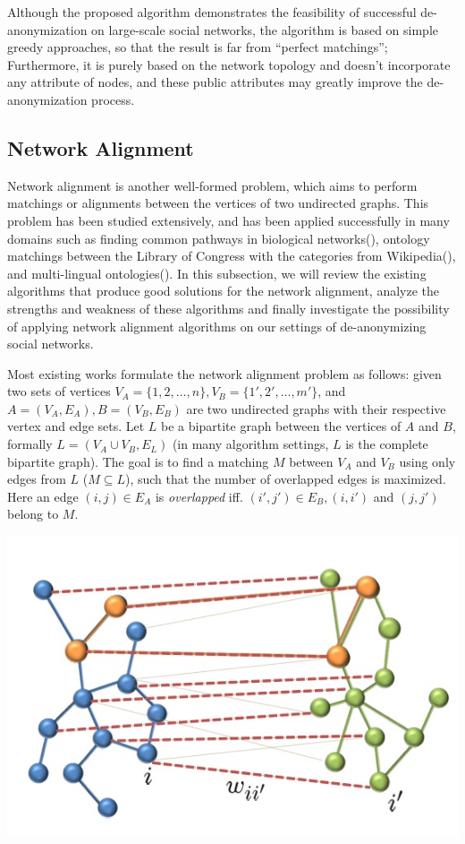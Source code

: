 \documentclass[11pt,letterpaper]{article}
\begin{document}
Although the proposed algorithm demonstrates the feasibility of successful de-anonymization on large-scale social networks, the algorithm is based on simple greedy approaches, so that the result is far from ``perfect matchings''; Furthermore, it is purely based on the network topology and doesn't incorporate any attribute of nodes, and these public attributes may greatly improve the de-anonymization process.

\subsection{Network Alignment}
Network alignment is another well-formed problem, which aims to perform matchings or alignments between the vertices of two undirected graphs. This problem has been studied extensively, and has been applied successfully in many domains such as finding common pathways in biological networks(\cite{Singh2007, Singh2008, Liao2009}), ontology matchings between the Library of Congress with the categories from Wikipedia(\cite{Bayati2009}), and multi-lingual ontologies(\cite{Kreitmann2011, Bayati2009a}). In this subsection, we will review the existing algorithms that produce good solutions for the network alignment, analyze the strengths and weakness of these algorithms and finally investigate the possibility of applying network alignment algorithms on our settings of de-anonymizing social networks.
 
Most existing works formulate the network alignment problem as follows: given two sets of vertices $V_A = \{1, 2, \ldots, n\}, V_B = \{1', 2', \ldots, m'\}$, and $A = (V_A, E_A), B = (V_B, E_B)$ are two undirected graphs with their respective vertex and edge sets. Let $L$ be a bipartite graph between the vertices of $A$ and $B$, formally $L = (V_A \cup V_B, E_L)$ (in many algorithm settings, $L$ is the complete bipartite graph). The goal is to find a matching $M$ between $V_A$ and $V_B$ using only edges from $L$ ($M \subseteq L$), such that the number of overlapped edges is maximized. Here an edge $(i, j) \in E_A$ is \textit{overlapped} iff. $(i', j') \in E_B, (i, i')$ and $(j, j')$ belong to $M$.

\begin{center}
\includegraphics[scale = 0.4]{fig/matching}
\end{center}
\end{document}
